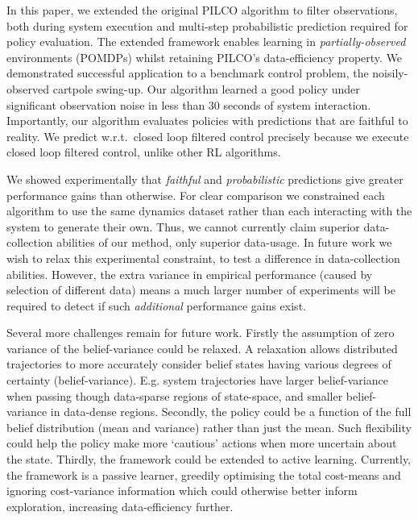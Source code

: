 \documentclass{article}
\begin{document}
In this paper,
we extended the original PILCO algorithm \cite{pilco} to filter observations,
both during system execution and multi-step probabilistic prediction required for policy evaluation.
The extended framework enables learning in \textit{partially-observed} environments (POMDPs)
whilst retaining PILCO's data-efficiency property.
We demonstrated successful application to a benchmark control problem,
the noisily-observed cartpole swing-up.
Our algorithm %
learned a good policy under significant observation noise in less than 30 seconds of system interaction. %
Importantly, our algorithm evaluates policies with predictions that are faithful to reality.
We predict w.r.t.\ closed loop filtered control precisely because we execute closed loop filtered control,
unlike other RL algorithms. %

We showed experimentally that \textit{faithful} and \textit{probabilistic}
predictions give greater performance gains than otherwise.
For clear comparison we constrained each algorithm to use the same dynamics dataset
rather than each interacting with the system to generate their own.
Thus, we cannot currently claim superior data-collection abilities of our method,
only superior data-usage.
In future work we wish to relax this experimental constraint, %
to test a difference in data-collection abilities.
However, the extra variance in empirical performance
(caused by selection of different data)
means a much larger number of experiments
will be required to detect if such \textit{additional} performance gains exist.

Several more challenges remain for future work.
Firstly the assumption of zero variance of the belief-variance could be relaxed.
A relaxation allows distributed trajectories to more accurately
consider belief states having various degrees of certainty (belief-variance).
E.g. system trajectories have larger belief-variance when passing though
data-sparse regions of state-space,
and smaller belief-variance in data-dense regions.
Secondly, the policy could be a function of the full belief distribution (mean and variance)
rather than just the mean. Such flexibility could help the policy make more `cautious' actions when more uncertain about the state.
Thirdly, the framework could be extended to active learning.
Currently, the framework is a passive learner,
greedily optimising the total cost-means
and ignoring cost-variance information which could otherwise better inform exploration,
increasing data-efficiency further.
\end{document}

